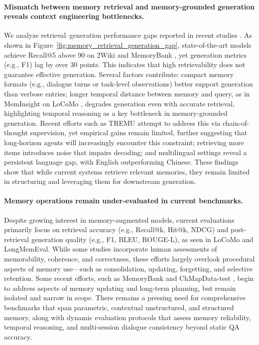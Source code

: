 \documentclass[manuscript,screen]{acmart}
\begin{document}
\paragraph{Mismatch between memory retrieval and memory-grounded generation reveals context engineering bottlenecks.} We analyze retrieval–generation performance gaps reported in recent studies \citep{gutierrez2024hipporag, maharana2024evaluating, wu2024longmemeval, zhong2024memorybank}. As shown in Figure~\ref{fig:memory_retrieval_generation_gap}, state-of-the-art models achieve Recall@5 above 90 on 2Wiki and MemoryBank \citep{gutierrez2024hipporag, zhong2024memorybank}, yet generation metrics (e.g., F1) lag by over 30 points. This indicates that high retrievability does not guarantee effective generation. Several factors contribute: compact memory formats (e.g., dialogue turns or task-level observations) better support generation than verbose entries; longer temporal distance between memory and query, as in MemInsight on LoCoMo \citep{salama2025meminsight}, degrades generation even with accurate retrieval, highlighting temporal reasoning as a key bottleneck in memory-grounded generation. Recent efforts such as TREMU \citep{ge2025tremu} attempt to address this via chain-of-thought supervision, yet empirical gains remain limited, further suggesting that long-horizon agents will increasingly encounter this constraint; retrieving more items introduces noise that impairs decoding; and multilingual settings reveal a persistent language gap, with English outperforming Chinese. These findings show that while current systems retrieve relevant memories, they remain limited in structuring and leveraging them for downstream generation.

\paragraph{Memory operations remain under-evaluated in current benchmarks.} Despite growing interest in memory-augmented models, current evaluations primarily focus on retrieval accuracy (e.g., Recall@k, Hit@k, NDCG) and post-retrieval generation quality (e.g., F1, BLEU, ROUGE-L), as seen in LoCoMo and LongMemEval. While some studies incorporate human assessments of memorability, coherence, and correctness, these efforts largely overlook procedural aspects of memory use—such as consolidation, updating, forgetting, and selective retention. Some recent efforts, such as MemoryBank and ChMapData-test \citep{wu2025interpersonal}, begin to address aspects of memory updating and long-term planning, but remain isolated and narrow in scope. There remains a pressing need for comprehensive benchmarks that span parametric, contextual unstructured, and structured memory, along with dynamic evaluation protocols that assess memory reliability, temporal reasoning, and multi-session dialogue consistency beyond static QA accuracy.
\end{document}
